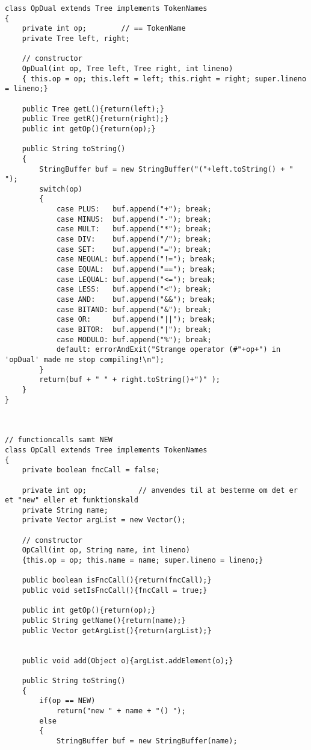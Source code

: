 \begin{footnotesize}
\begin{verbatim}
class OpDual extends Tree implements TokenNames
{
    private int op;        // == TokenName
    private Tree left, right;
    
    // constructor
    OpDual(int op, Tree left, Tree right, int lineno)
    { this.op = op; this.left = left; this.right = right; super.lineno = lineno;}
    
    public Tree getL(){return(left);}
    public Tree getR(){return(right);}
    public int getOp(){return(op);}
    
    public String toString()
    {    
        StringBuffer buf = new StringBuffer("("+left.toString() + " ");
        switch(op)
        {
            case PLUS:   buf.append("+"); break;
            case MINUS:  buf.append("-"); break;
            case MULT:   buf.append("*"); break;
            case DIV:    buf.append("/"); break;
            case SET:    buf.append("="); break;
            case NEQUAL: buf.append("!="); break;
            case EQUAL:  buf.append("=="); break;
            case LEQUAL: buf.append("<="); break;
            case LESS:   buf.append("<"); break;
            case AND:    buf.append("&&"); break;
            case BITAND: buf.append("&"); break;
            case OR:     buf.append("||"); break;
            case BITOR:  buf.append("|"); break;
            case MODULO: buf.append("%"); break;
            default: errorAndExit("Strange operator (#"+op+") in 'opDual' made me stop compiling!\n");
        }
        return(buf + " " + right.toString()+")" );
    }
}



// functioncalls samt NEW
class OpCall extends Tree implements TokenNames
{
    private boolean fncCall = false;
    
    private int op;            // anvendes til at bestemme om det er et "new" eller et funktionskald
    private String name;
    private Vector argList = new Vector();

    // constructor
    OpCall(int op, String name, int lineno)
    {this.op = op; this.name = name; super.lineno = lineno;}
    
    public boolean isFncCall(){return(fncCall);}
    public void setIsFncCall(){fncCall = true;}
    
    public int getOp(){return(op);}
    public String getName(){return(name);}
    public Vector getArgList(){return(argList);}


    public void add(Object o){argList.addElement(o);}
    
    public String toString()
    {
        if(op == NEW)
            return("new " + name + "() ");
        else
        {        
            StringBuffer buf = new StringBuffer(name);


\end{verbatim}
\end{footnotesize}
